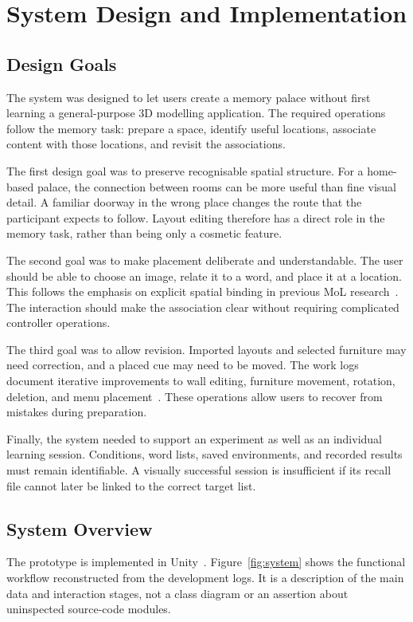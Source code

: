 \chapter{System Design and Implementation}
\label{chap:implementation}

\section{Design Goals}
The system was designed to let users create a memory palace without first learning a general-purpose 3D modelling application. The required operations follow the memory task: prepare a space, identify useful locations, associate content with those locations, and revisit the associations.

The first design goal was to preserve recognisable spatial structure. For a home-based palace, the connection between rooms can be more useful than fine visual detail. A familiar doorway in the wrong place changes the route that the participant expects to follow. Layout editing therefore has a direct role in the memory task, rather than being only a cosmetic feature.

The second goal was to make placement deliberate and understandable. The user should be able to choose an image, relate it to a word, and place it at a location. This follows the emphasis on explicit spatial binding in previous MoL research~\cite{reggente2020}. The interaction should make the association clear without requiring complicated controller operations.

The third goal was to allow revision. Imported layouts and selected furniture may need correction, and a placed cue may need to be moved. The work logs document iterative improvements to wall editing, furniture movement, rotation, deletion, and menu placement~\cite{logdec18,logjuly17}. These operations allow users to recover from mistakes during preparation.

Finally, the system needed to support an experiment as well as an individual learning session. Conditions, word lists, saved environments, and recorded results must remain identifiable. A visually successful session is insufficient if its recall file cannot later be linked to the correct target list.

\section{System Overview}
The prototype is implemented in Unity~\cite{meetingjan2026}. Figure~\ref{fig:system} shows the functional workflow reconstructed from the development logs. It is a description of the main data and interaction stages, not a class diagram or an assertion about uninspected source-code modules.

